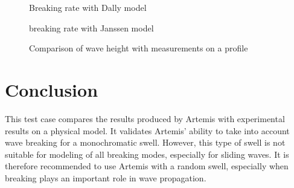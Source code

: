 \begin{figure}[h]
\begin{center}
\end{center}
\caption{Breaking rate with Dally model}
\label{fig:breaking_QB_Dally}
\end{figure}

\begin{figure}[h]
\begin{center}
\end{center}
\caption{breaking rate with Janssen model}
\label{fig:breaking_QB_Janssen}
\end{figure}

\begin{figure}[h]
  \begin{center}
\end{center}
\caption{Comparison of wave height with measurements on a profile}
\label{fig:breaking_WH_Profile}
\end{figure}

\section{Conclusion}
This test case compares the results produced by Artemis with experimental
results on a physical model. It validates Artemis' ability to take into account
wave breaking for a monochromatic swell. However, this type of swell is not
suitable for modeling of all breaking modes, especially for sliding waves. It
is therefore recommended to use Artemis with a random swell, especially when
breaking plays an important role in wave propagation.
